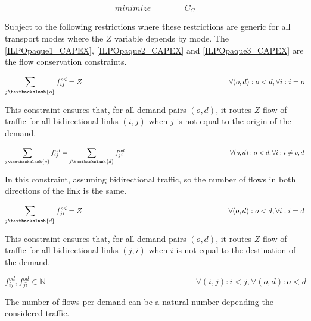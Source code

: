 \begin{equation}
minimize \qquad \qquad C_C
\label{ILPOpaque_CAPEX}
\end{equation}

\vspace{11pt}
Subject to the following restrictions where these restrictions are generic for all transport modes where the $Z$ variable depends by mode. The \ref{ILPOpaque1_CAPEX}, \ref{ILPOpaque2_CAPEX} and \ref{ILPOpaque3_CAPEX} are the flow conservation constraints.

\begin{equation}
\sum_{j\textbackslash \{o\}} f_{ij}^{od} = Z  \qquad \qquad \qquad \qquad \qquad \qquad \qquad \qquad \qquad \qquad
\forall(o,d) : o < d, \forall i: i = o
\label{ILPOpaque1_CAPEX}
\end{equation}

This constraint ensures that, for all demand pairs $(o,d)$, it routes $Z$ flow of traffic for all bidirectional links $(i,j)$ when $j$ is not equal to the origin of the demand.

\begin{equation}
\sum_{j\textbackslash \{o\}} f_{ij}^{od} = \sum_{j\textbackslash \{d\}} f_{ji}^{od}   \qquad \qquad \qquad \qquad \qquad \qquad \qquad \qquad
\forall(o,d) : o < d, \forall i: i \neq o,d
\label{ILPOpaque2_CAPEX}
\end{equation}

In this constraint, assuming bidirectional traffic, so the number of flows in both directions of the link is the same.

\begin{equation}
\sum_{j\textbackslash \{d\}} f_{ji}^{od} = Z  \qquad \qquad \qquad \qquad \qquad \qquad \qquad \qquad \qquad \qquad
\forall(o,d) : o < d, \forall i: i = d
\label{ILPOpaque3_CAPEX}
\end{equation}

This constraint ensures that, for all demand pairs $(o,d)$, it routes $Z$ flow of traffic for all bidirectional links $(j,i)$ when $i$ is not equal to the destination of the demand.

\begin{equation}
f_{ij}^{od} , f_{ji}^{od} \in \mathbb{N}   \qquad \qquad \qquad \qquad \qquad \qquad \qquad \qquad \qquad
\forall(i,j) : i < j, \forall(o,d) : o < d
\label{ILPOpaque6_CAPEX}
\end{equation}

The number of flows per demand can be a natural number depending the considered traffic.


